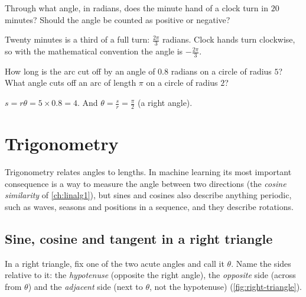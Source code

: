 \begin{exercise}
Through what angle, in radians, does the minute hand of a clock turn in $20$
minutes? Should the angle be counted as positive or negative?
\end{exercise}
\begin{solution}
Twenty minutes is a third of a full turn: $\tfrac{2\pi}{3}$ radians. Clock
hands turn clockwise, so with the mathematical convention the angle is
$-\tfrac{2\pi}{3}$.
\end{solution}

\begin{exercise}
How long is the arc cut off by an angle of $0.8$ radians on a circle of radius
$5$? What angle cuts off an arc of length $\pi$ on a circle of radius $2$?
\end{exercise}
\begin{solution}
$s = r\theta = 5 \times 0.8 = 4$. And $\theta = \tfrac{s}{r} = \tfrac{\pi}{2}$
(a right angle).
\end{solution}

\section{Trigonometry}\label{sec:trigonometry}

\begin{motivation}
Trigonometry relates angles to lengths. In machine learning its most important
consequence is a way to measure the angle between two directions (the
\emph{cosine similarity} of \cref{ch:linalg1}), but sines and cosines also
describe anything periodic, such as waves, seasons and positions in a
sequence, and they describe rotations.
\end{motivation}

\subsection{Sine, cosine and tangent in a right triangle}

In a right triangle, fix one of the two acute angles and call it $\theta$. Name
the sides relative to it: the \emph{hypotenuse} (opposite the right angle),
the \emph{opposite} side (across from $\theta$) and the \emph{adjacent} side
(next to $\theta$, not the hypotenuse) (\cref{fig:right-triangle}).

